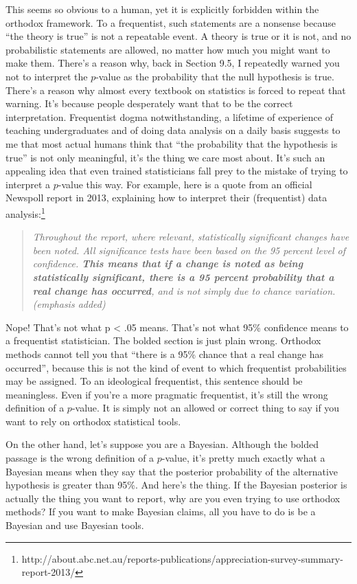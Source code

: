 \documentclass[
  a4paper,
]{book}
\begin{document}
This seems so obvious to a human, yet it is explicitly forbidden within
the orthodox framework. To a frequentist, such statements are a nonsense
because ``the theory is true'' is not a repeatable event. A theory is
true or it is not, and no probabilistic statements are allowed, no
matter how much you might want to make them. There's a reason why, back
in Section 9.5, I repeatedly warned you not to interpret the \(p\)-value
as the probability that the null hypothesis is true. There's a reason
why almost every textbook on statistics is forced to repeat that
warning. It's because people desperately want that to be the correct
interpretation. Frequentist dogma notwithstanding, a lifetime of
experience of teaching undergraduates and of doing data analysis on a
daily basis suggests to me that most actual humans think that ``the
probability that the hypothesis is true'' is not only meaningful, it's
the thing we care most about. It's such an appealing idea that even
trained statisticians fall prey to the mistake of trying to interpret a
\(p\)-value this way. For example, here is a quote from an official
Newspoll report in 2013, explaining how to interpret their (frequentist)
data analysis:\footnote{http://about.abc.net.au/reports-publications/appreciation-survey-summary-report-2013/}

\begin{quote}
\emph{Throughout the report, where relevant, statistically significant
changes have been noted. All significance tests have been based on the
95 percent level of confidence. \textbf{This means that if a change is
noted as being statistically significant, there is a 95 percent
probability that a real change has occurred}, and is not simply due to
chance variation. (emphasis added)}
\end{quote}

Nope! That's not what p \textless{} .05 means. That's not what 95\%
confidence means to a frequentist statistician. The bolded section is
just plain wrong. Orthodox methods cannot tell you that ``there is a
95\% chance that a real change has occurred'', because this is not the
kind of event to which frequentist probabilities may be assigned. To an
ideological frequentist, this sentence should be meaningless. Even if
you're a more pragmatic frequentist, it's still the wrong definition of
a \(p\)-value. It is simply not an allowed or correct thing to say if
you want to rely on orthodox statistical tools.

On the other hand, let's suppose you are a Bayesian. Although the bolded
passage is the wrong definition of a \(p\)-value, it's pretty much
exactly what a Bayesian means when they say that the posterior
probability of the alternative hypothesis is greater than 95\%. And
here's the thing. If the Bayesian posterior is actually the thing you
want to report, why are you even trying to use orthodox methods? If you
want to make Bayesian claims, all you have to do is be a Bayesian and
use Bayesian tools.
\end{document}
